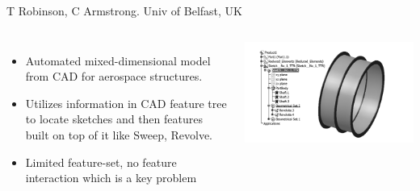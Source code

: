 
\begin{frame}[<+-| alert@+>]{T Robinson, C Armstrong. Univ of Belfast, UK \cite{Robinson2007}}

\begin{columns}[T]

	\begin{itemize}[noitemsep,label=\textbullet,topsep=2pt,parsep=2pt,partopsep=2pt]
	\item Automated mixed-dimensional model from CAD for aerospace structures.
	\item Utilizes information in CAD feature tree to locate sketches and then features built on top of it like Sweep, Revolve.
	\item Limited feature-set, no feature interaction which is a key problem
	\end{itemize}
	\includegraphics[scale=0.5]{../Common/images/Robinson.png}
\end{columns}

\end{frame}


